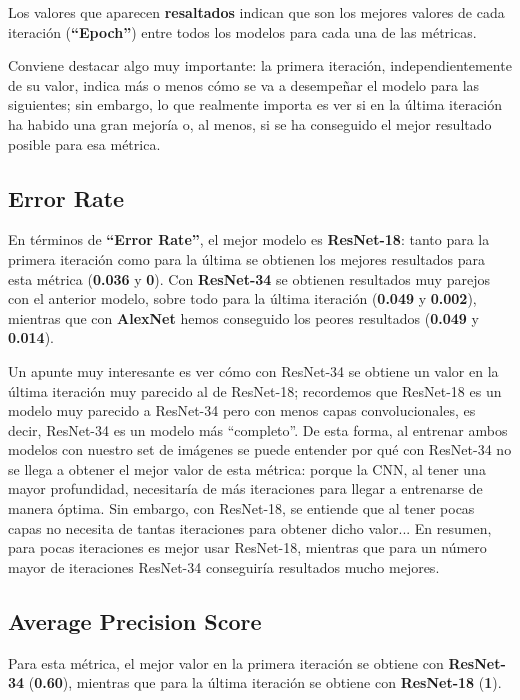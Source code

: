 Los valores que aparecen \textbf{resaltados} indican que son los mejores valores de cada iteración (\textbf{``Epoch''}) entre todos los modelos para cada una de las métricas.

Conviene destacar algo muy importante: la primera iteración, independientemente de su valor, indica más o menos cómo se va a desempeñar el modelo para las siguientes; sin embargo, lo que realmente importa es ver si en la última iteración ha habido una gran mejoría o, al menos, si se ha conseguido el mejor resultado posible para esa métrica.

\subsection{Error Rate}

En términos de \textbf{``Error Rate''}, el mejor modelo es \textbf{ResNet-18}: tanto para la primera iteración como para la última se obtienen los mejores resultados para esta métrica (\textbf{0.036} y \textbf{0}). Con \textbf{ResNet-34} se obtienen resultados muy parejos con el anterior modelo, sobre todo para la última iteración (\textbf{0.049} y \textbf{0.002}), mientras que con \textbf{AlexNet} hemos conseguido los peores resultados (\textbf{0.049} y \textbf{0.014}).

Un apunte muy interesante es ver cómo con ResNet-34 se obtiene un valor en la última iteración muy parecido al de ResNet-18; recordemos que ResNet-18 es un modelo muy parecido a ResNet-34 pero con menos capas convolucionales, es decir, ResNet-34 es un modelo más ``completo''. De esta forma, al entrenar ambos modelos con nuestro set de imágenes se puede entender por qué con ResNet-34 no se llega a obtener el mejor valor de esta métrica: porque la \ac{CNN}, al tener una mayor profundidad, necesitaría de más iteraciones para llegar a entrenarse de manera óptima. Sin embargo, con ResNet-18, se entiende que al tener pocas capas no necesita de tantas iteraciones para obtener dicho valor... En resumen, para pocas iteraciones es mejor usar ResNet-18, mientras que para un número mayor de iteraciones ResNet-34 conseguiría resultados mucho mejores.

\subsection{Average Precision Score}

Para esta métrica, el mejor valor en la primera iteración se obtiene con \textbf{ResNet-34} (\textbf{0.60}), mientras que para la última iteración se obtiene con \textbf{ResNet-18} (\textbf{1}).

